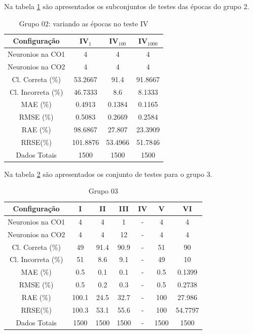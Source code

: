 \documentclass[journal, a4paper]{IEEEtran}
\begin{document}
Na tabela \ref{grupo02IV} são apresentados os subconjuntos de testes das épocas do grupo 2. 

\begin{table}[ht]
	\begin{center}
		\caption{Grupo $02$: variando as épocas no teste IV}
		\label{grupo02IV}
		\begin{tabular}{|c|c|c|c|}\hline	
			\textbf{Configuração} &$\textbf{IV}_{1}$&$\textbf{IV}_{100}$&$\textbf{IV}_{1000}$ \\ \hline 
			{Neuronios na CO1}   & 4      & 4     & 4      \\ \hline
			{Neuronios na CO2}   & 4      & 4     & 4      \\ \hline
			{Cl. Correta (\%)}   & 53.2667   & 91.4   & 91.8667  \\ \hline
			{Cl. Incorreta (\%)} & 46.7333   & 8.6    & 8.1333   \\ \hline
			{MAE (\%)}           & 0.4913   & 0.1384  & 0.1165   \\ \hline
			{RMSE (\%)}          & 0.5083   & 0.2669  & 0.2584   \\ \hline
			{RAE (\%)}           & 98.6867 & 27.807 & 23.3909   \\ \hline
			{RRSE(\%)}           & 101.8876 & 53.4966 & 51.7846  \\ \hline
			{Dados Totais}       & 1500   & 1500  & 1500   \\ \hline
		\end{tabular}  
	\end{center}
\end{table}

Na tabela \ref{grupo03} são apresentados os conjunto de testes para o grupo 3. 

\begin{table}[ht]
	\begin{center}
		\caption{Grupo $03$}
		\label{grupo03}
		\begin{tabular}{|c|c|c|c|c|c|c|}\hline	
			\textbf{Configuração} &\textbf{I}&\textbf{II}&\textbf{III}&\textbf{IV}&\textbf{V}&\textbf{VI} \\ \hline 
			{Neuronios na CO1} & 4 & 4 & 1 & - & 4 & 4 \\ \hline
			{Neuronios na CO2} & 4 & 4 & 12 & - & 4 & 4 \\ \hline
			{Cl. Correta (\%)} & 49  & 91.4  & 90.9  & - & 51 &  90 \\ \hline
			{Cl. Incorreta (\%)} & 51  & 8.6 & 9.1 & - & 49 & 10 \\ \hline
			{MAE (\%)} & 0.5 &  0.1 & 0.1 & - & 0.5  &  0.1399 \\ \hline
			{RMSE (\%)} & 0.5 & 0.2 & 0.3 & - & 0.5 &  0.2738 \\ \hline
			{RAE (\%)} & 100.1 & 24.5 & 32.7 & - & 100 & 27.986 \\ \hline
			{RRSE(\%)} & 100.3 & 53.1 & 55.6 & - & 100 & 54.7797 \\ \hline
			{Dados Totais} & 1500 & 1500  & 1500 & - & 1500 & 1500 \\ \hline
		\end{tabular}  
	\end{center}
\end{table}
\end{document}
